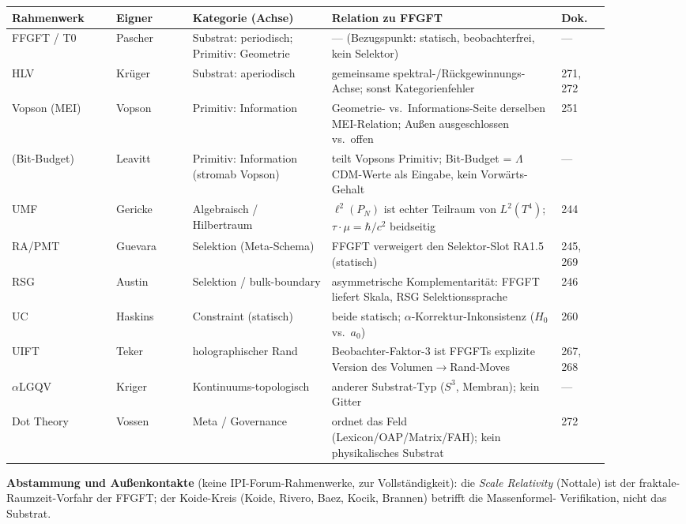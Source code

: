 \begin{center}
\footnotesize
\begin{tabular}{@{}p{0.155\linewidth}p{0.115\linewidth}p{0.205\linewidth}p{0.33\linewidth}p{0.07\linewidth}@{}}
\hline
\textbf{Rahmenwerk} & \textbf{Eigner} & \textbf{Kategorie (Achse)} & \textbf{Relation zu FFGFT} & \textbf{Dok.}\\
\hline
FFGFT / T0 & Pascher & Substrat: periodisch; Primitiv: Geometrie & --- (Bezugspunkt: statisch, beobachterfrei, kein Selektor) & ---\\
HLV & Krüger & Substrat: aperiodisch & gemeinsame spektral-/Rückgewinnungs-Achse; sonst Kategorienfehler & 271, 272\\
Vopson (MEI) & Vopson & Primitiv: Information & Geometrie- vs.\ Informations-Seite derselben MEI-Relation; Außen ausgeschlossen vs.\ offen & 251\\
(Bit-Budget) & Leavitt & Primitiv: Information (stromab Vopson) & teilt Vopsons Primitiv; Bit-Budget = $\Lambda$CDM-Werte als Eingabe, kein Vorwärts-Gehalt & ---\\
UMF & Gericke & Algebraisch / Hilbertraum & $\ell^2(P_N)$ ist echter Teilraum von $L^2(T^4)$; $\tau\!\cdot\!\mu=\hbar/c^2$ beidseitig & 244\\
RA/PMT & Guevara & Selektion (Meta-Schema) & FFGFT verweigert den Selektor-Slot RA1.5 (statisch) & 245, 269\\
RSG & Austin & Selektion / bulk-boundary & asymmetrische Komplementarität: FFGFT liefert Skala, RSG Selektionssprache & 246\\
UC & Haskins & Constraint (statisch) & beide statisch; $\alpha$-Korrektur-Inkonsistenz ($H_0$ vs.\ $a_0$) & 260\\
UIFT & Teker & holographischer Rand & Beobachter-Faktor-3 ist FFGFTs explizite Version des Volumen$\to$Rand-Moves & 267, 268\\
$\alpha$LGQV & Kriger & Kontinuums-topologisch & anderer Substrat-Typ ($S^3$, Membran); kein Gitter & ---\\
Dot Theory & Vossen & Meta / Governance & ordnet das Feld (Lexicon/OAP/Matrix/FAH); kein physikalisches Substrat & 272\\
\hline
\end{tabular}
\end{center}

\noindent\textbf{Abstammung und Außenkontakte} (keine IPI-Forum-Rahmenwerke, zur
Vollständigkeit): die \emph{Scale Relativity} (Nottale) ist der fraktale-Raumzeit-Vorfahr
der FFGFT; der Koide-Kreis (Koide, Rivero, Baez, Kocik, Brannen) betrifft die Massenformel-
Verifikation, nicht das Substrat.

